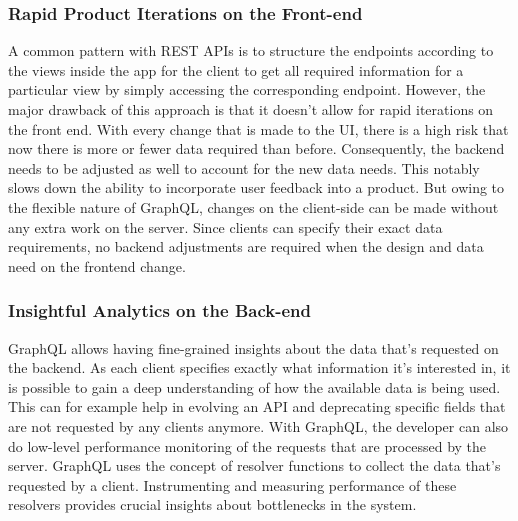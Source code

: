 \subsubsection{Rapid Product Iterations on the Front-end}

A common pattern with REST APIs is to structure the endpoints according to the views inside the app for the client to get all required information for a particular view by simply accessing the corresponding endpoint. However, the major drawback of this approach is that it doesn’t allow for rapid iterations on the front end. 
With every change that is made to the UI, there is a high risk that now there is more or fewer data required than before.
Consequently, the backend needs to be adjusted as well to account for the new data needs. This notably slows down the ability to incorporate user feedback into a product. But owing to the flexible nature of GraphQL, changes on the client-side can be made without any extra work on the server. Since clients can specify their exact data requirements, 
no backend adjustments are required when the design and data need on the frontend change.

\subsubsection{Insightful Analytics on the Back-end}

GraphQL allows having fine-grained insights about the data that’s requested on the backend. As each client specifies exactly what information it’s interested in, it is possible to gain a deep understanding of how the available data is being used. This can for example help in evolving an API and deprecating specific fields that are not requested by any clients anymore.
With GraphQL, the developer can also do low-level performance monitoring of the requests that are processed by the server. 
GraphQL uses the concept of resolver functions to collect the data that’s requested by a client. Instrumenting and measuring 
performance of these resolvers provides crucial insights about bottlenecks in the system.~\cite{GraphQLvsREST}
